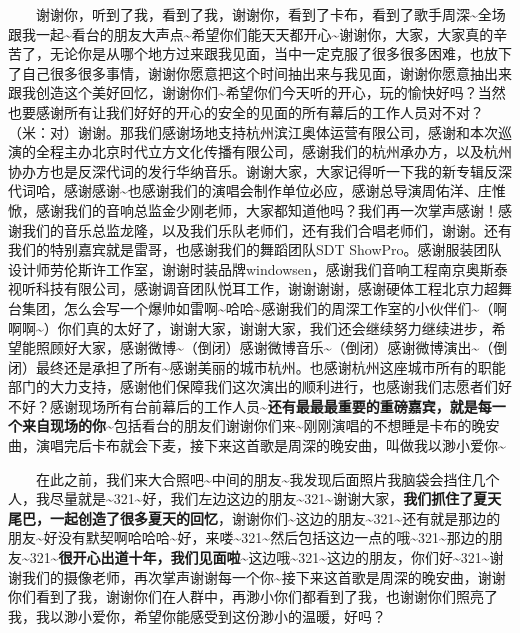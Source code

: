 \documentclass[]{ctexbook}
\begin{document}
  谢谢你，听到了我，看到了我，谢谢你，看到了卡布，看到了歌手周深\textasciitilde 全场跟我一起\textasciitilde 看台的朋友大声点\textasciitilde 希望你们能天天都开心\textasciitilde 谢谢你，大家，大家真的辛苦了，无论你是从哪个地方过来跟我见面，当中一定克服了很多很多困难，也放下了自己很多很多事情，谢谢你愿意把这个时间抽出来与我见面，谢谢你愿意抽出来跟我创造这个美好回忆，谢谢你们\textasciitilde 希望你们今天听的开心，玩的愉快好吗？当然也要感谢所有让我们好好的开心的安全的见面的所有幕后的工作人员对不对？（米：对）谢谢。那我们感谢场地支持杭州滨江奥体运营有限公司，感谢和本次巡演的全程主办北京时代立方文化传播有限公司，感谢我们的杭州承办方，以及杭州协办方也是反深代词的发行华纳音乐。谢谢大家，大家记得听一下我的新专辑反深代词哈，感谢感谢\textasciitilde 也感谢我们的演唱会制作单位必应，感谢总导演周佑洋、庄惟惞，感谢我们的音响总监金少刚老师，大家都知道他吗？我们再一次掌声感谢！感谢我们的音乐总监龙隆，以及我们乐队老师们，还有我们合唱老师们，谢谢。还有我们的特别嘉宾就是雷哥，也感谢我们的舞蹈团队SDT ShowPro。感谢服装团队设计师劳伦斯许工作室，谢谢时装品牌windowsen，感谢我们音响工程南京奥斯泰视听科技有限公司，感谢调音团队悦耳工作，谢谢谢谢，感谢硬体工程北京力超舞台集团，怎么会写一个爆帅如雷啊\textasciitilde 哈哈\textasciitilde 感谢我们的周深工作室的小伙伴们\textasciitilde（啊啊啊\textasciitilde）你们真的太好了，谢谢大家，谢谢大家，我们还会继续努力继续进步，希望能照顾好大家，感谢微博\textasciitilde（倒闭）感谢微博音乐\textasciitilde（倒闭）感谢微博演出\textasciitilde（倒闭）最终还是承担了所有\textasciitilde 感谢美丽的城市杭州。也感谢杭州这座城市所有的职能部门的大力支持，感谢他们保障我们这次演出的顺利进行，也感谢我们志愿者们好不好？感谢现场所有台前幕后的工作人员\textasciitilde{}\textbf{还有最最最重要的重磅嘉宾，就是每一个来自现场的你\textasciitilde{}}包括看台的朋友们谢谢你们来\textasciitilde 刚刚演唱的不想睡是卡布的晚安曲，演唱完后卡布就会下麦，接下来这首歌是周深的晚安曲，叫做我以渺小爱你\textasciitilde{}

  在此之前，我们来大合照吧\textasciitilde 中间的朋友\textasciitilde 我发现后面照片我脑袋会挡住几个人，我尽量就是\textasciitilde321\textasciitilde 好，我们左边这边的朋友\textasciitilde321\textasciitilde 谢谢大家，\textbf{我们抓住了夏天尾巴，一起创造了很多夏天的回忆}，谢谢你们\textasciitilde 这边的朋友\textasciitilde321\textasciitilde 还有就是那边的朋友\textasciitilde 好没有默契啊哈哈哈\textasciitilde 好，来喽\textasciitilde321\textasciitilde 然后包括这边一点的哦\textasciitilde321\textasciitilde 那边的朋友\textasciitilde321\textasciitilde{}\textbf{很开心出道十年，我们见面啦\textasciitilde{}}这边哦\textasciitilde321\textasciitilde 这边的朋友，你们好\textasciitilde321\textasciitilde 谢谢我们的摄像老师，再次掌声谢谢每一个你\textasciitilde 接下来这首歌是周深的晚安曲，谢谢你们看到了我，谢谢你们在人群中，再渺小你们都看到了我，也谢谢你们照亮了我，我以渺小爱你，希望你能感受到这份渺小的温暖，好吗？
\end{document}
